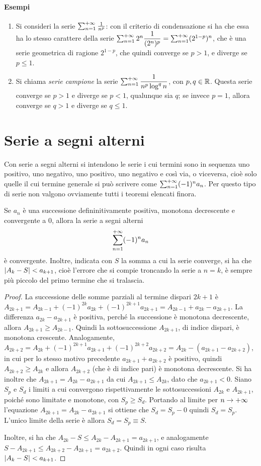 \paragraph{Esempi}
\begin{enumerate}
\item Si consideri la serie $\sum_{{n}=1}^{+\infty}\frac1{n^p}$: con il criterio di condensazione si ha che essa ha lo stesso carattere della serie $\sum_{{n}=1}^{+\infty}2^n\dfrac1{(2^n)^p}=\sum_{{n}=1}^{+\infty}(2^{1-p})^n$, che è una serie geometrica di ragione $2^{1-p}$, che quindi converge se $p>1$, e diverge se $p\leq 1$.
\item Si chiama \emph{serie campione} la serie $\sum_{{n}=1}^{+\infty}\dfrac1{n^p\log^q n}$, con $p,q\in\mathbb{R}$. Questa serie converge se $p>1$ e diverge se $p<1$, qualunque sia $q$; se invece $p=1$, allora converge se $q>1$ e diverge se $q\leq 1$.
\end{enumerate}
\section{Serie a segni alterni}
Con serie a segni alterni si intendono le serie i cui termini sono in sequenza uno positivo, uno negativo, uno positivo, uno negativo e così via, o viceversa, cioè solo quelle il cui termine generale si può scrivere come $\sum_{{n}=1}^{+\infty}(-1)^na_n$. Per questo tipo di serie non valgono ovviamente tutti i teoremi elencati finora.
\begin{teorema}
\label{t:criterio_leibnitz}
Se $a_n$ è una successione defininitivamente positiva, monotona decrescente e convergente a 0, allora la serie a segni alterni
\[
\sum_{{n}=1}^{+\infty}(-1)^n a_n
\]
è convergente. Inoltre, indicata con $S$ la somma a cui la serie converge, si ha che $\left|{A_k-S}\right|<a_{k+1}$, cioè l'errore che si compie troncando la serie a $n=k$, è sempre più piccolo del primo termine che si tralascia.
\end{teorema}
\begin{proof}
La successione delle somme parziali al termine dispari $2k+1$ è $A_{2k+1}=A_{2k-1}+(-1)^{2k}a_{2k}+(-1)^{2k+1}a_{2k+1}=A_{2k-1}+a_{2k}-a_{2k+1}$. La differenza $a_{2k}-a_{2k+1}$ è positiva, perché la successione è monotona decrescente, allora $A_{2k+1}\geq A_{2k-1}$. Quindi la sottosuccessione $A_{2k+1}$, di indice dispari, è monotona crescente. Analogamente, $A_{2k+2}=A_{2k}+(-1)^{2k+1}a_{2k+1}+(-1)^{2k+2}a_{2k+2}=A_{2k}-(a_{2k+1}-a_{2k+2})$, in cui per lo stesso motivo precedente $a_{2k+1}+a_{2k+2}$ è positivo, quindi $A_{2k+2}\geq A_{2k}$ e allora $A_{2k+2}$ (che è di indice pari) è monotona decrescente.
Si ha inoltre che $A_{2k+1}=A_{2k}-a_{2k+1}$ da cui $A_{2k+1}\leq A_{2k}$, dato che $a_{2k+1}<0$. Siano $S_p$ e $S_d$ i limiti a cui convergono rispettivamente le sottosuccessioni $A_{2k}$ e $A_{2k+1}$, poiché sono limitate e monotone, con $S_p\geq S_d$. Portando al limite per $n\to+\infty$ l'equazione $A_{2k+1}=A_{2k}-a_{2k+1}$ si ottiene che $S_d=S_p-0$ quindi $S_d=S_p$. L'unico limite della serie è allora $S_d=S_p\equiv S$.

Inoltre, si ha che $A_{2k}-S\leq A_{2k}-A_{2k+1}=a_{2k+1}$, e analogamente $S-A_{2k+1}\leq A_{2k+2}-A_{2k+1}=a_{2k+2}$. Quindi in ogni caso risulta $\left|{A_k-S}\right|<a_{k+1}$.
\end{proof}
